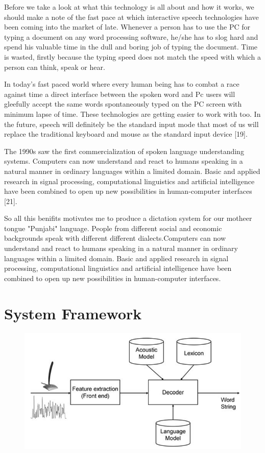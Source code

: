\documentclass[12pt,a4paper,oneside]{memoir}
\begin{document}
Before we take a look at what this technology is all about and how it works, we
should make a note of the fast pace at which interactive speech technologies have
been coming into the market of late. Whenever a person has to use the PC for typing a
document on any word processing software, he/she has to slog hard and spend his
valuable time in the dull and boring job of typing the document. Time is wasted,
firstly because the typing speed does not match the speed with which a person can
think, speak or hear.

In today’s fast paced
world where every human being has to combat a race against time a direct interface
between the spoken word and Pc users will gleefully accept the same words
spontaneously typed on the PC screen with minimum lapse of time. These
technologies are getting easier to work with too. In the future, speech will definitely
be the standard input mode that most of us will replace the traditional keyboard and
mouse as the standard input device [19].

The 1990s saw the first commercialization of spoken language understanding
systems. Computers can now understand and react to humans speaking in a natural
manner in ordinary languages within a limited domain. Basic and applied research in
signal processing, computational linguistics and artificial intelligence have been
combined to open up new possibilities in human-computer interfaces [21].

So all this benifits motivates me to produce a dictation system for our motheer tongue "Punjabi" language. People from different social and economic backgrounds speak with different different dialects.Computers can now understand and react to humans speaking in a natural
manner in ordinary languages within a limited domain. Basic and applied research in
signal processing, computational linguistics and artificial intelligence have been
combined to open up new possibilities in human-computer interfaces.

\newpage

\section{System Framework}

\begin{figure}[h]
    \centering
    \includegraphics[scale=0.5]{tmp725d99_thumb}
\end{figure}
\end{document}
